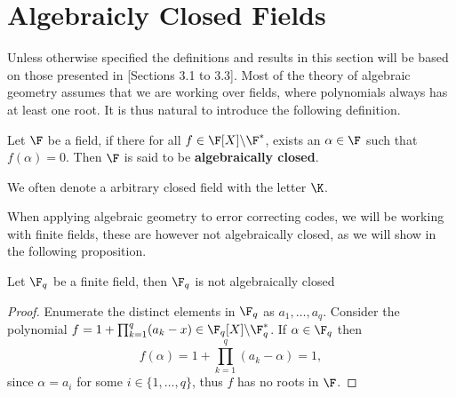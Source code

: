 \section{Algebraicly Closed Fields}%
Unless otherwise specified the definitions and results in this section will be based on those presented in \citep{alg_notes}[Sections 3.1 to 3.3].
Most of the theory of algebraic geometry assumes that we are working over fields, where polynomials always has at least one root. It is thus natural to introduce the following definition.
\begin{definition}\label{def:alg_closed}
  Let $\F$ be a field, if there for all $f \in \F[X] \backslash \F^*$, exists an $\alpha \in \F$ such that $f(\alpha) = 0$. Then $\F$ is said to be \textbf{algebraically closed}.
\end{definition}
\begin{remark}
  We often denote a arbitrary closed field with the letter $\K$.
\end{remark}

When applying algebraic geometry to error correcting codes, we will be working with finite fields, these are however not algebraically closed, as we will show in the following proposition.
\begin{proposition}\label{prop:finite_fields_arent_algebraicly_closed}
  Let $\F_{q}$ be a finite field, then $\F_{q}$ is not algebraically closed
\end{proposition}
\begin{proof}
  Enumerate the distinct elements in $\F_{q}$ as $a_{1}, \ldots, a_{q}$. Consider the polynomial $f = 1 + \prod^{q}_{k = 1} (a_{k} - x) \in \F_{q}[X] \backslash \F_{q}^{*}$. If $\alpha \in \F_{q}$ then
  \begin{equation*}
    f(\alpha) = 1 + \prod^{q}_{k = 1} (a_{k} - \alpha) = 1,
  \end{equation*}
  since $\alpha = a_{i}$ for some $i \in \{1, \ldots, q\}$, thus $f$ has no roots in $\F$.
\end{proof}

